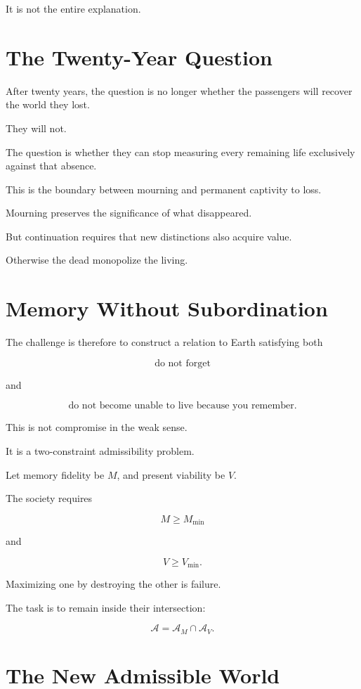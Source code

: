 \documentclass[11pt,oneside]{book}
\theoremstyle{definition}
\theoremstyle{remark}
\newcommand{\A}{\mathcal{A}}
\begin{document}
It is not the entire explanation.

\section{The Twenty-Year Question}

After twenty years, the question is no longer whether the passengers will recover the world they lost.

They will not.

The question is whether they can stop measuring every remaining life exclusively against that absence.

This is the boundary between mourning and permanent captivity to loss.

Mourning preserves the significance of what disappeared.

But continuation requires that new distinctions also acquire value.

Otherwise the dead monopolize the living.

\section{Memory Without Subordination}

The challenge is therefore to construct a relation to Earth satisfying both

\[
\text{do not forget}
\]

and

\[
\text{do not become unable to live because you remember}.
\]

This is not compromise in the weak sense.

It is a two-constraint admissibility problem.

Let memory fidelity be \(M\), and present viability be \(V\).

The society requires

\[
M\geq M_{\min}
\]

and

\[
V\geq V_{\min}.
\]

Maximizing one by destroying the other is failure.

The task is to remain inside their intersection:

\[
\A
=
\A_M\cap\A_V.
\]

\section{The New Admissible World}
\end{document}
